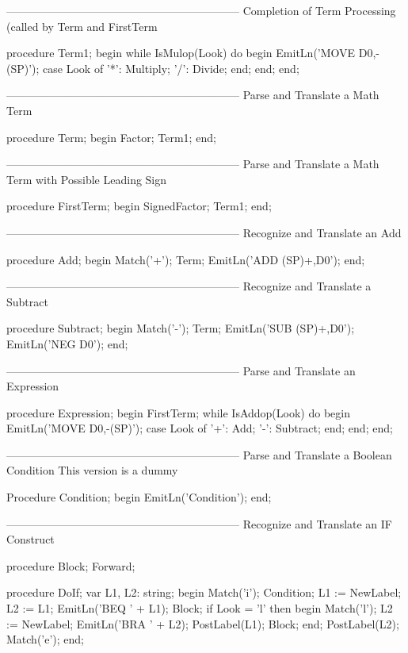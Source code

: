 \documentclass[float=false, crop=false]{standalone}
\begin{document}
\begin{code}
{---------------------------------------------------------------}
{ Completion of Term Processing  (called by Term and FirstTerm }

procedure Term1;
begin
   while IsMulop(Look) do begin
      EmitLn('MOVE D0,-(SP)');
      case Look of
       '*': Multiply;
       '/': Divide;
      end;
   end;
end;


{---------------------------------------------------------------}
{ Parse and Translate a Math Term }

procedure Term;
begin
   Factor;
   Term1;
end;


{---------------------------------------------------------------}
{ Parse and Translate a Math Term with Possible Leading Sign }

procedure FirstTerm;
begin
   SignedFactor;
   Term1;
end;


{---------------------------------------------------------------}
{ Recognize and Translate an Add }

procedure Add;
begin
   Match('+');
   Term;
   EmitLn('ADD (SP)+,D0');
end;


{---------------------------------------------------------------}
{ Recognize and Translate a Subtract }

procedure Subtract;
begin
   Match('-');
   Term;
   EmitLn('SUB (SP)+,D0');
   EmitLn('NEG D0');
end;


{---------------------------------------------------------------}
{ Parse and Translate an Expression }

procedure Expression;
begin
   FirstTerm;
   while IsAddop(Look) do begin
      EmitLn('MOVE D0,-(SP)');
      case Look of
       '+': Add;
       '-': Subtract;
      end;
   end;
end;


{---------------------------------------------------------------}
{ Parse and Translate a Boolean Condition }
{ This version is a dummy }

Procedure Condition;
begin
   EmitLn('Condition');
end;


{---------------------------------------------------------------}
{ Recognize and Translate an IF Construct }

procedure Block;
 Forward;

procedure DoIf;
var L1, L2: string;
begin
   Match('i');
   Condition;
   L1 := NewLabel;
   L2 := L1;
   EmitLn('BEQ ' + L1);
   Block;
   if Look = 'l' then begin
      Match('l');
      L2 := NewLabel;
      EmitLn('BRA ' + L2);
      PostLabel(L1);
      Block;
   end;
   PostLabel(L2);
   Match('e');
end;



\end{code}
\end{document}
